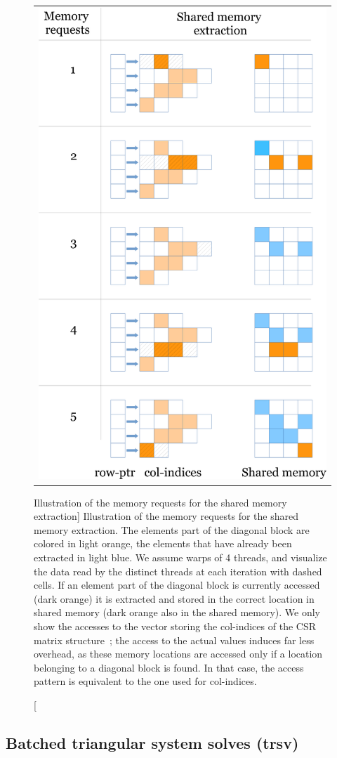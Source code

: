\begin{figure}[p]
\begin{center}
\begin{tabular}{c}
\includegraphics[width=.5\columnwidth]{plots/extraction}
\end{tabular}
\end{center}
\caption
[Illustration of the memory requests for the shared memory extraction]
{Illustration of the memory requests for the shared memory extraction.
The elements part of the diagonal block are colored in light orange, the elements that have already been extracted in light blue.
We assume warps of 4 threads, and visualize the data read by the distinct threads at each iteration with dashed cells.
If an element part of the diagonal block is currently accessed (dark orange) it is extracted and stored in the correct location
in shared memory (dark orange also in the shared memory).
We only show the accesses to the vector storing the {\sf col-indices} of the CSR matrix structure~\cite{saad}; 
the access to the actual values induces far less overhead,
as these memory locations are accessed only if a location belonging to a diagonal block is found.
In that case, the access pattern is equivalent to the one used for {\sf col-indices}.
}
\label{2017-lu-block-jacobi:fig:extraction}
\end{figure}

\subsection{Batched triangular system solves ({\sc trsv})}

